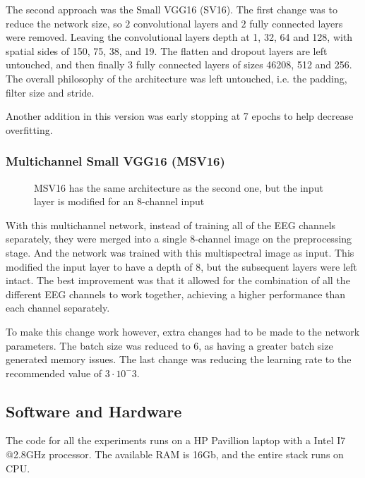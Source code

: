 \documentclass[conference]{IEEEtran}
\begin{document}
The second approach was the Small VGG16  (SV16). The first change was to reduce the network size, so $2$ convolutional layers and $2$ fully connected layers were removed. Leaving the convolutional layers depth at 1, 32, 64 and 128, with spatial sides of 150, 75, 38, and 19. The flatten and dropout layers are left untouched, and then finally $3$ fully connected layers of sizes 46208, 512 and 256. The overall philosophy of the architecture was left untouched, i.e. the padding, filter size and stride.

Another addition in this version was early stopping at 7 epochs to help decrease overfitting. 

\subsubsection{Multichannel Small VGG16 (MSV16)}

\begin{figure*}[h]

\caption[MSV16 Neural Network]{MSV16 has the same architecture as the second one, but the input layer is modified for an 8-channel input}
\label{fig:nnv3}
\end{figure*}

With this multichannel network, instead of training all of the EEG channels separately, they were merged into a single 8-channel image on the preprocessing stage. And the network was trained with this multispectral image as input. This modified the input layer to have a depth of 8, but the subsequent layers were left intact. The best improvement was that it allowed for the combination of all the different EEG channels to work together, achieving a higher performance than each channel separately.

To make this change work however, extra changes had to be made to the network parameters. The batch size was reduced to 6, as having a greater batch size generated memory issues. The last change was reducing the learning rate to the recommended value of $3\cdot10^-3$.

\subsection{Software and Hardware}
The code for all the experiments runs on a HP Pavillion laptop with a Intel I7 @2.8GHz processor. The available RAM is 16Gb, and the entire stack runs on CPU.
\end{document}
